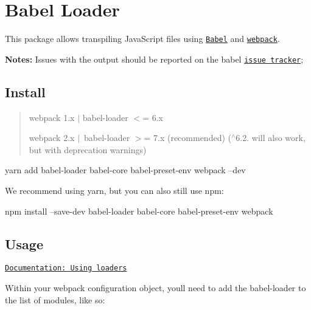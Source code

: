 \href{https://www.npmjs.com/package/babel-loader}{\tt } \href{https://travis-ci.org/babel/babel-loader}{\tt } \href{https://ci.appveyor.com/project/danez/babel-loader/branch/master}{\tt } \href{https://codecov.io/gh/babel/babel-loader}{\tt }

 \href{https://github.com/babel/babel/}{\tt } \href{https://github.com/webpack/webpack}{\tt } \section*{Babel Loader}

 

This package allows transpiling Java\+Script files using \href{https://github.com/babel/babel}{\tt Babel} and \href{https://github.com/webpack/webpack}{\tt webpack}.

{\bfseries Notes\+:} Issues with the output should be reported on the babel \href{https://github.com/babel/babel/issues}{\tt issue tracker};

\subsection*{Install}

\begin{quote}
webpack 1.\+x $\vert$ babel-\/loader $<$= 6.\+x

webpack 2.\+x $\vert$ babel-\/loader $>$= 7.\+x (recommended) ($^\wedge$6.2. will also work, but with deprecation warnings) \end{quote}



\begin{DoxyCode}
yarn add babel-loader babel-core babel-preset-env webpack --dev
\end{DoxyCode}


We recommend using yarn, but you can also still use npm\+:


\begin{DoxyCode}
npm install --save-dev babel-loader babel-core babel-preset-env webpack
\end{DoxyCode}


\subsection*{Usage}

\href{https://webpack.js.org/loaders/}{\tt Documentation\+: Using loaders}

Within your webpack configuration object, you\textquotesingle{}ll need to add the babel-\/loader to the list of modules, like so\+:


